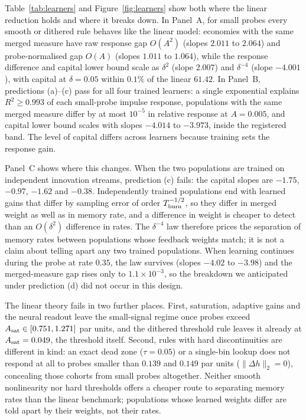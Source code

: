 \documentclass[12pt]{article}
\theoremstyle{definition}
\theoremstyle{remark}
\begin{document}
Table~\ref{tab:learners} and Figure~\ref{fig:learners} show both where the linear reduction holds and where it breaks down. In Panel~A, for small probes every smooth or dithered rule behaves like the linear model: economies with the same merged measure have raw response gap $O(A^2)$ (slopes $2.011$ to $2.064$) and probe-normalised gap $O(A)$ (slopes $1.011$ to $1.064$), while the response difference and capital lower bound scale as $\delta^2$ (slope $2.007$) and $\delta^{-4}$ (slope $-4.001$), with capital at $\delta=0.05$ within $0.1\%$ of the linear $61.42$. In Panel~B, predictions (a)--(c) pass for all four trained learners: a single exponential explains $R^2\ge0.993$ of each small-probe impulse response, populations with the same merged measure differ by at most $10^{-5}$ in relative response at $A=0.005$, and capital lower bound scales with slopes $-4.014$ to $-3.973$, inside the registered band. The level of capital differs across learners because training sets the response gain.

Panel~C shows where this changes. When the two populations are trained on independent innovation streams, prediction (c) fails: the capital slopes are $-1.75$, $-0.97$, $-1.62$ and $-0.38$. Independently trained populations end with learned gains that differ by sampling error of order $T_{\rm burn}^{-1/2}$, so they differ in merged weight as well as in memory rate, and a difference in weight is cheaper to detect than an $O(\delta^2)$ difference in rates. The $\delta^{-4}$ law therefore prices the separation of memory rates between populations whose feedback weights match; it is not a claim about telling apart any two trained populations. When learning continues during the probe at rate $0.35$, the law survives (slopes $-4.02$ to $-3.98$) and the merged-measure gap rises only to $1.1\times10^{-3}$, so the breakdown we anticipated under prediction (d) did not occur in this design.

The linear theory fails in two further places. First, saturation, adaptive gains and the neural readout leave the small-signal regime once probes exceed $A_{\rm sat}\in[0.751,1.271]$ par units, and the dithered threshold rule leaves it already at $A_{\rm sat}=0.049$, the threshold itself. Second, rules with hard discontinuities are different in kind: an exact dead zone ($\tau=0.05$) or a single-bin lookup does not respond at all to probes smaller than $0.139$ and $0.149$ par units ($\|\Delta h\|_2=0$), concealing those cohorts from small probes altogether. Neither smooth nonlinearity nor hard thresholds offers a cheaper route to separating memory rates than the linear benchmark; populations whose learned weights differ are told apart by their weights, not their rates.
\end{document}
